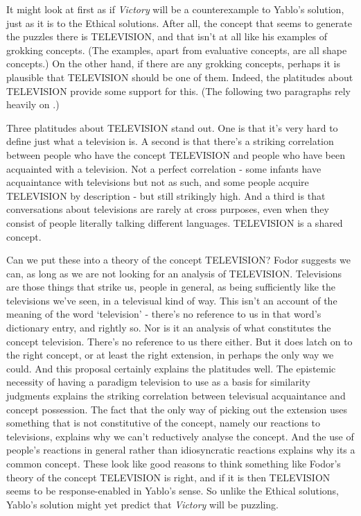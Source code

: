 \noindent It might look at first as if \textit{Victory} will be a counterexample to Yablo's solution, just as it is to the Ethical solutions. After all, the concept that seems to generate the puzzles there is TELEVISION, and that isn't at all like his examples of grokking concepts. (The examples, apart from evaluative concepts, are all shape concepts.) On the other hand, if there are any grokking concepts, perhaps it is plausible that TELEVISION should be one of them. Indeed, the platitudes about TELEVISION  provide some support for this. (The following two paragraphs rely heavily on \citet{Fodor1998}.)

Three platitudes about TELEVISION stand out. One is that it's very hard to define just what a television is. A second is that there's a striking correlation between people who have the concept TELEVISION and people who have been acquainted with a television. Not a perfect correlation - some infants have acquaintance with televisions but not as such, and some people acquire TELEVISION by description - but still strikingly high. And a third is that conversations about televisions are rarely at cross purposes, even when they consist of people literally talking different languages. TELEVISION is a shared concept.

Can we put these into a theory of the concept TELEVISION? Fodor suggests we can, as long as we are not looking for an analysis of TELEVISION. Televisions are those things that strike us, people in general, as being sufficiently like the televisions we've seen, in a televisual kind of way. This isn't an account of the meaning of the word `television' - there's no reference to us in that word's dictionary entry, and rightly so. Nor is it an analysis of what constitutes the concept television. There's no reference to us there either. But it does latch on to the right concept, or at least the right extension, in perhaps the only way we could. And this proposal certainly explains the platitudes well. The epistemic necessity of having a paradigm television to use as a basis for similarity judgments explains the striking correlation between televisual acquaintance and concept possession. The fact that the only way of picking out the extension uses something that is not constitutive of the concept, namely our reactions to televisions, explains why we can't reductively analyse the concept. And the use of people's reactions in general rather than idiosyncratic reactions explains why its a common concept. These look like good reasons to think something like Fodor's theory of the concept TELEVISION is right, and if it is then TELEVISION seems to be response-enabled in Yablo's sense. So unlike the Ethical solutions, Yablo's solution might yet predict that \textit{Victory }will be puzzling.

